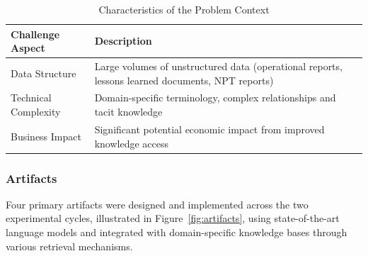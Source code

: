         \begin{table}[h]
            \centering
            \caption{Characteristics of the Problem Context}
            \begin{tabular}{|p{}|p{}|}
            \hline
            \textbf{Challenge Aspect} & \textbf{Description} \\
            \hline
            Data Structure & Large volumes of unstructured data (operational reports, lessons learned documents, NPT reports) \\
            \hline
            Technical Complexity & Domain-specific terminology, complex relationships and tacit knowledge \\
            \hline
            Business Impact & Significant potential economic impact from improved knowledge access \\
            \hline
            \end{tabular}
            \label{tab:problem-context}
        \end{table}
        
        \subsubsection{Artifacts}
        
        Four primary artifacts were designed and implemented across the two experimental cycles, illustrated in Figure~\ref{fig:artifacts}, using state-of-the-art language models and integrated with domain-specific knowledge bases through various retrieval mechanisms.
        
